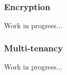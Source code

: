 \documentclass[conference]{IEEEtran}
\begin{document}
\subsubsection{Encryption}
Work in progress...

\subsubsection{Multi-tenancy}
Work in progress...




%
%



%
%
\end{document}
